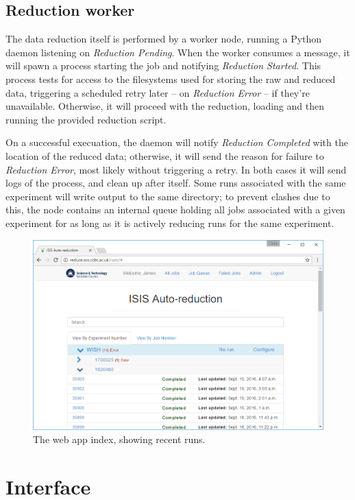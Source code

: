 \documentclass[twocolumn]{article}
\begin{document}
\subsection{Reduction worker}\label{reduction-worker}

The data reduction itself is performed by a worker node, running a
Python daemon listening on \emph{Reduction Pending}. When the worker
consumes a message, it will spawn a process starting the job and
notifying \emph{Reduction Started}. This process tests for access to the
filesystems used for storing the raw and reduced data, triggering a
scheduled retry later -- on \emph{Reduction Error} -- if they're
unavailable. Otherwise, it will proceed with the reduction, loading and
then running the provided reduction script.

On a successful execuation, the daemon will notify \emph{Reduction Completed} with
the location of the reduced data; otherwise, it will send the reason for
failure to \emph{Reduction Error}, most likely without triggering a
retry. In both cases it will send logs of the process, and clean up
after itself. Some runs associated with the same experiment will write
output to the same directory; to prevent clashes due to this, the node
contains an internal queue holding all jobs associated with a given
experiment for as long as it is actively reducing runs for the
same experiment.


\begin{figure}
\centering\includegraphics[width=0.8\linewidth]{index.png}
\caption{The web app index, showing recent runs.}
\end{figure}

\section{Interface}\label{interface}
\end{document}

